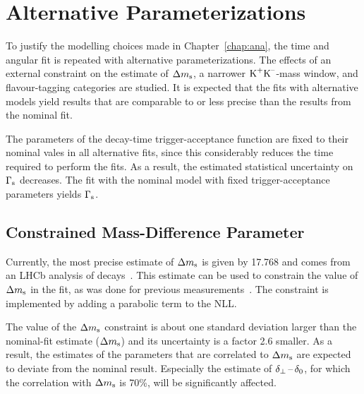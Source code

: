 \section{Alternative Parameterizations}
\label{sec:result_altParam}

To justify the modelling choices made in Chapter~\ref{chap:ana}, the time and angular fit is repeated with alternative parameterizations.
The effects of an external constraint on the estimate of $\Delta m_\text{s}$, a narrower $\text{K}^\text{+}\text{K}^\text{--}$-mass window, and flavour-tagging categories are studied.
It is expected that the fits with alternative models yield results that are comparable to or less precise than the results from the nominal
fit.

The parameters of the decay-time trigger-acceptance function are fixed to their nominal vales in all alternative fits, since this
considerably reduces the time required to perform the fits. As a result, the estimated statistical uncertainty on $\Gamma_\text{s}$ decreases. The fit
with the nominal model with fixed trigger-acceptance parameters yields $\Gamma_\text{s}$\unitsp\invps.


\subsection{Constrained Mass-Difference Parameter}
\label{subsec:result_altParam_Delm}

Currently, the most precise estimate of $\Delta m_\text{s}$ is given by 17.768\unitsp\invps{} and comes from an LHCb analysis of
\BstoDsmpip{} decays~\cite{LHCb-PAPER-2013-006}. This estimate can be used to constrain the value of $\Delta m_\text{s}$ in the \BstoJpsiKK{} fit, as
was done for previous measurements~\cite{LHCb-PAPER-2011-021,*LHCb-ANA-2011-036,LHCb-PAPER-2013-002,*LHCb-ANA-2012-067}. The constraint is
implemented by adding a parabolic term to the NLL.

The value of the $\Delta m_\text{s}$ constraint is about one standard deviation larger than the nominal-fit estimate
($\Delta m_\text{s}$\unitsp\invps) and its uncertainty is a factor 2.6 smaller. As a result, the estimates of the parameters
that are correlated to $\Delta m_\text{s}$ are expected to deviate from the nominal result. Especially the estimate of $\delta_{\perp}\,\text{--}\,\delta_{0}$, for which the
correlation with $\Delta m_\text{s}$ is 70\%, will be significantly affected.


